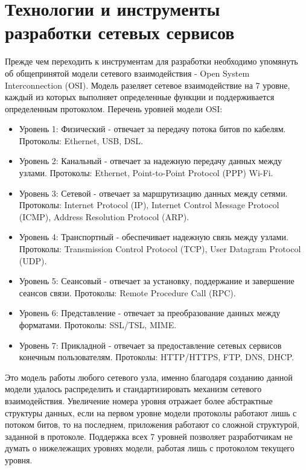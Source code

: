 \documentclass[a4paper, 14pt]{extreport}
\begin{document}
\section{Технологии и инструменты разработки сетевых сервисов}
Прежде чем переходить к инструментам для разработки необходимо упомянуть об общепринятой модели сетевого взаимодействия - Open System
Interconnection (OSI)\cite{osiArt}\cite{osiArt1}. Модель разеляет сетевое взаимодействие на 7 уровне, каждый из которых выполняет определенные функции и поддерживается
определенным протоколом. Перечень уровней модели OSI:
\begin{itemize}
        \item Уровень 1: Физический - отвечает за передачу потока битов по кабелям. Протоколы: Ethernet, USB, DSL.
        \item Уровень 2: Канальный - отвечает за надежную передачу данных между узлами. Протоколы: Ethernet, Point-to-Point Protocol (PPP)
              Wi-Fi.
        \item Уровень 3: Сетевой - отвечает за маршрутизацию данных между сетями. Протоколы: Internet Protocol (IP), Internet Control 
              Message Protocol (ICMP), Address Resolution Protocol (ARP).
        \item Уровень 4: Транспортный - обеспечивает надежную связь между узлами. Протоколы: Transmission Control Protocol (TCP),
              User Datagram Protocol (UDP).
        \item Уровень 5: Сеансовый - отвечает за установку, поддержание и завершение сеансов связи. Протоколы: Remote Procedure Call (RPC).
        \item Уровень 6: Представление - отвечает за преобразование данных между форматами. Протоколы: SSL/TSL, MIME.
        \item Уровень 7: Прикладной - отвечает за предоставление сетевых сервисов конечным пользователям. Протоколы: HTTP/HTTPS, FTP, DNS,
              DHCP.
\end{itemize}
\par Это модель работы любого сетевого узла, именно благодаря созданию данной модели удалось распределить и стандартизировать механизм 
сетевого взаимодействия. Увеличение номера уровня отражает более абстрактные структуры данных, если на первом уровне модели протоколы
работают лишь с потоком битов, то на последнем, приложения работают со сложной структурой, заданной в протоколе. Поддержка всех 7 уровней 
позволяет разработчикам не думать о нижележащих уровнях модели, работая лишь с протоколом текущего уровня.
\end{document}
